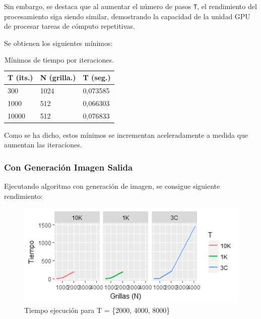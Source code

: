 \documentclass[jou]{apa6}
\begin{document}
Sin embargo, se destaca que al aumentar el número de pasos \texttt{T}, el rendimiento del procesamiento siga siendo similar, demostrando la capacidad de la unidad GPU de procesar tareas de cómputo repetitivas. 

Se obtienen los siguientes mínimos: 

\begin{table}[h]
\centering
\caption{Mínimos de tiempo por iteraciones.}
\label{my-label}
\begin{tabular}{@{}lll@{}}
\toprule
\multicolumn{1}{c}{T (its.)} & \multicolumn{1}{c}{N (grilla.)} & \multicolumn{1}{c}{T (seg.)} \\ \midrule
300                          & 1024                         & 0,073585                     \\
1000                         & 512                          & 0,066303                     \\
10000                        & 512                          & 0,076833                     \\ \bottomrule
\end{tabular}
\end{table}

Como se ha dicho, estos mínimos se incrementan aceleradamente a medida que aumentan las iteraciones.

\FloatBarrier

\subsubsection{Con Generación Imagen Salida}
Ejecutando algoritmo con generación de imagen, se consigue siguiente rendimiento:

\begin{figure}[h]
	\includegraphics[width=\columnwidth]{time-same-block-size-with-raw.png}
	\caption{Tiempo ejecución para T = \{2000, 4000, 8000\}}
	\label{fig:Figure2}
\end{figure}
\end{document}
